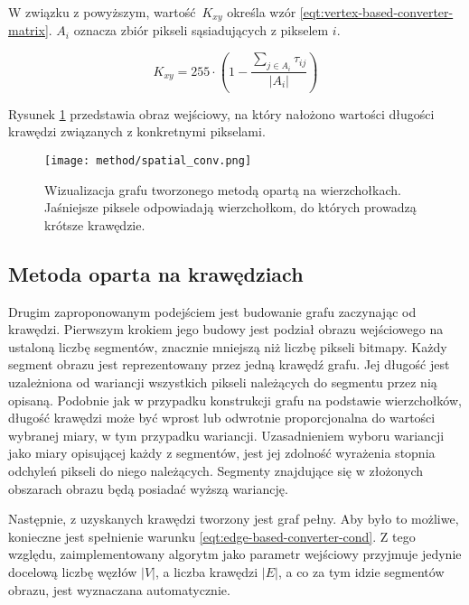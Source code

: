 {{{            W związku z powyższym, wartość $K_{xy}$ określa wzór \ref{eqt:vertex-based-converter-matrix}. $A_i$ oznacza
            zbiór pikseli sąsiadujących z pikselem $i$.

            \begin{equation}\label{eqt:vertex-based-converter-matrix}
                K_{xy} = 255 \cdot (1 - \frac{\sum_{j \in A_i} \tau_{ij}}{|A_i|})
            \end{equation}

            Rysunek \ref{fig:method-vis-vertex} przedstawia obraz wejściowy, na który nałożono wartości długości
            krawędzi związanych z konkretnymi pikselami.

            \begin{figure}
                \centering
                \texttt{[image: method/spatial\_conv.png]}
                \caption{Wizualizacja grafu tworzonego metodą opartą na wierzchołkach. Jaśniejsze piksele odpowiadają wierzchołkom, do których prowadzą krótsze krawędzie.}
                \label{fig:method-vis-vertex}
            \end{figure}
        }

        \subsection{Metoda oparta na krawędziach}\label{subsec:edge-method}
        {
            Drugim zaproponowanym podejściem jest budowanie grafu zaczynając od krawędzi. Pierwszym krokiem jego budowy
            jest podział obrazu wejściowego na ustaloną liczbę segmentów, znacznie mniejszą niż liczbę pikseli
            bitmapy. Każdy segment obrazu jest reprezentowany przez jedną krawędź grafu. Jej długość jest uzależniona od
            wariancji wszystkich pikseli należących do segmentu przez nią opisaną. Podobnie jak w przypadku konstrukcji
            grafu na podstawie wierzchołków, długość krawędzi może być wprost lub odwrotnie proporcjonalna do wartości
            wybranej miary, w tym przypadku wariancji. Uzasadnieniem wyboru wariancji jako miary opisującej każdy z
            segmentów, jest jej zdolność wyrażenia stopnia odchyleń pikseli do niego należących. Segmenty znajdujące się
            w złożonych obszarach obrazu będą posiadać wyższą wariancję.

            Następnie, z uzyskanych krawędzi tworzony jest graf pełny. Aby było to możliwe, konieczne jest spełnienie
            warunku \ref{eqt:edge-based-converter-cond}. Z tego względu, zaimplementowany algorytm jako parametr
            wejściowy przyjmuje jedynie docelową liczbę węzłów $|V|$, a liczba krawędzi $|E|$, a co za tym idzie
            segmentów obrazu, jest wyznaczana automatycznie.

}}}
